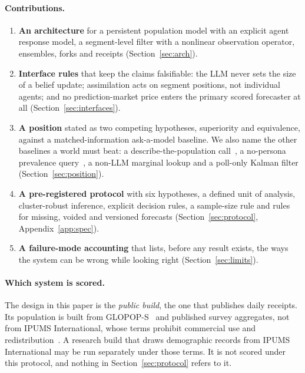 \documentclass[11pt]{article}
\begin{document}
\paragraph{Contributions.}
\begin{enumerate}
  \item \textbf{An architecture} for a persistent population model with an explicit agent response model, a segment-level filter with a nonlinear observation operator, ensembles, forks and receipts (Section~\ref{sec:arch}).
  \item \textbf{Interface rules} that keep the claims falsifiable: the LLM never sets the size of a belief update; assimilation acts on segment positions, not individual agents; and no prediction-market price enters the primary scored forecaster at all (Section~\ref{sec:interfaces}).
  \item \textbf{A position} stated as two competing hypotheses, superiority and equivalence, against a matched-information ask-a-model baseline. We also name the other baselines a world must beat: a describe-the-population call~\citep{jang2026instruction}, a no-persona prevalence query~\citep{doudkin2026marginal}, a non-LLM marginal lookup and a poll-only Kalman filter (Section~\ref{sec:position}).
  \item \textbf{A pre-registered protocol} with six hypotheses, a defined unit of analysis, cluster-robust inference, explicit decision rules, a sample-size rule and rules for missing, voided and versioned forecasts (Section~\ref{sec:protocol}, Appendix~\ref{app:spec}).
  \item \textbf{A failure-mode accounting} that lists, before any result exists, the ways the system can be wrong while looking right (Section~\ref{sec:limits}).
\end{enumerate}

\paragraph{Which system is scored.} The design in this paper is the \emph{public build}, the one that publishes daily receipts. Its population is built from GLOPOP-S~\citep{ton2024glopop} and published survey aggregates, not from IPUMS International, whose terms prohibit commercial use and redistribution~\citep{ipumsi}. A research build that draws demographic records from IPUMS International may be run separately under those terms. It is not scored under this protocol, and nothing in Section~\ref{sec:protocol} refers to it.
\end{document}
